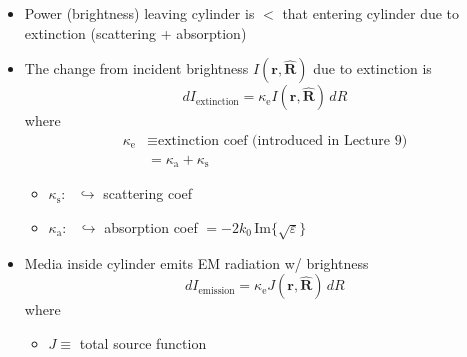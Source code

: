 \documentclass[11pt, oneside]{article}
\newcommand{\ke}{\kappa_\mathrm{e}}
\newcommand{\ka}{\kappa_\mathrm{a}}
\newcommand{\ks}{\kappa_\mathrm{s}}
\newcommand{\rv}{\mathbf{r}}
\newcommand{\Rh}{\hat{\mathbf{R}}}
\begin{document}
\begin{itemize}
	\item Power (brightness) leaving cylinder is $<$ that entering cylinder due to extinction (scattering + absorption)
	\item The change from incident brightness $I(\rv,\Rh)$ due to extinction is
	\begin{equation}
		\label{e:dIext}
		dI_\mathrm{extinction} = \ke I(\rv,\Rh)\,dR
	\end{equation}
	where
	\begin{align*}
		\ke &\equiv \text{extinction coef (introduced in Lecture~9)}\\
		&= \ka + \ks
	\end{align*}
	\begin{itemize}
		\item[] $\ks$: \ $\hookrightarrow$ scattering coef
		\item[] $\ka$: \ $\hookrightarrow$ absorption coef $= -2k_0\,\mathrm{Im}\{\sqrt{\varepsilon}\}$
	\end{itemize}
	\item Media inside cylinder emits EM radiation w/ brightness
	\begin{equation}
		\label{e:dIem}
		dI_\mathrm{emission} = \ke J(\rv,\Rh)\,dR
	\end{equation}
	where
	\begin{itemize}
		\item[] $J \equiv$ total source function
	\end{itemize}
\end{itemize}
\end{document}
